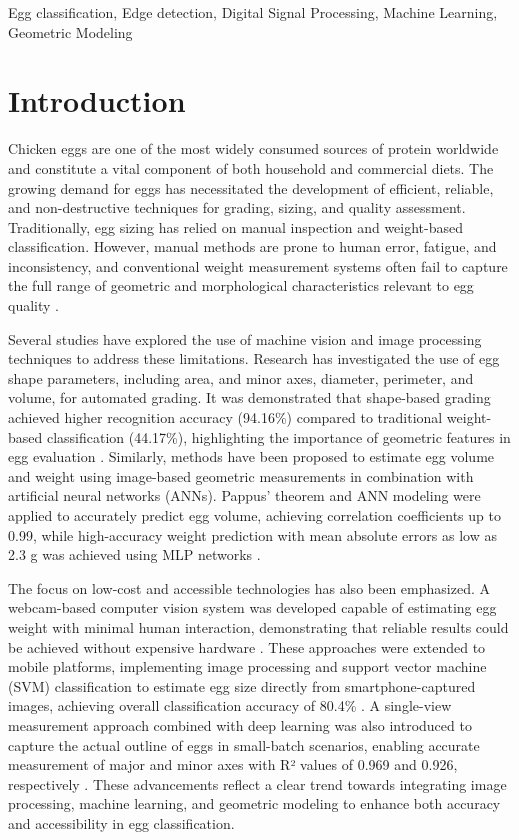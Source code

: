 \documentclass[conference]{IEEEtran}
\begin{document}
	\begin{IEEEkeywords}
		Egg classification, Edge detection, Digital Signal Processing, Machine Learning, Geometric Modeling
	\end{IEEEkeywords}
	
	\section{Introduction}
	Chicken eggs are one of the most widely consumed sources of protein worldwide and constitute a vital component of both household and commercial diets. The growing demand for eggs has necessitated the development of efficient, reliable, and non-destructive techniques for grading, sizing, and quality assessment. Traditionally, egg sizing has relied on manual inspection and weight-based classification. However, manual methods are prone to human error, fatigue, and inconsistency, and conventional weight measurement systems often fail to capture the full range of geometric and morphological characteristics relevant to egg quality \cite{asadi2010}\cite{bondoc2021}.
	
	Several studies have explored the use of machine vision and image processing techniques to address these limitations. Research has investigated the use of egg shape parameters, including area, and minor axes, diameter, perimeter, and volume, for automated grading. It was demonstrated that shape-based grading achieved higher recognition accuracy (94.16\%) compared to traditional weight-based classification (44.17\%), highlighting the importance of geometric features in egg evaluation \cite{nasir2018}. Similarly, methods have been proposed to estimate egg volume and weight using image-based geometric measurements in combination with artificial neural networks (ANNs). Pappus’ theorem and ANN modeling were applied to accurately predict egg volume, achieving correlation coefficients up to 0.99, while high-accuracy weight prediction with mean absolute errors as low as 2.3 g was achieved using MLP networks \cite{soltani2015}\cite{asadi2010}\cite{nasir2018}.
	
	The focus on low-cost and accessible technologies has also been emphasized. A webcam-based computer vision system was developed capable of estimating egg weight with minimal human interaction, demonstrating that reliable results could be achieved without expensive hardware \cite{okinda2020}. These approaches were extended to mobile platforms, implementing image processing and support vector machine (SVM) classification to estimate egg size directly from smartphone-captured images, achieving overall classification accuracy of 80.4\% \cite{thipakorn2017}. A single-view measurement approach combined with deep learning was also introduced to capture the actual outline of eggs in small-batch scenarios, enabling accurate measurement of major and minor axes with R² values of 0.969 and 0.926, respectively \cite{liu2023}. These advancements reflect a clear trend towards integrating image processing, machine learning, and geometric modeling to enhance both accuracy and accessibility in egg classification.
	
\end{document}
